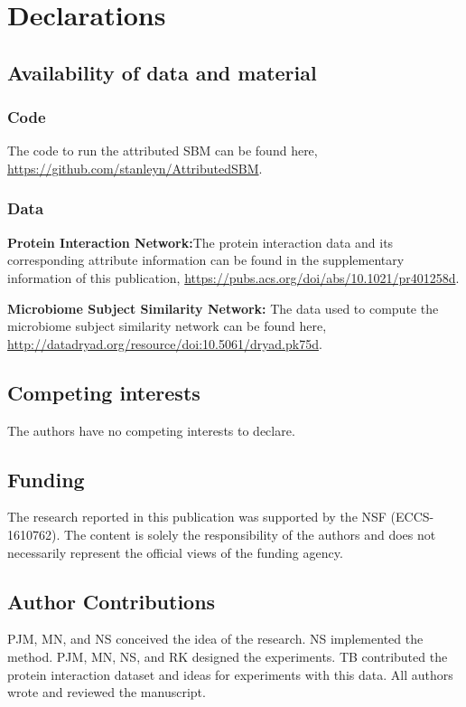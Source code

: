 \section{Declarations}

\subsection{Availability of data and material}

\subsubsection{Code}
The code to run the attributed SBM can be found here, \url{https://github.com/stanleyn/AttributedSBM}.

\subsubsection{Data}
{\bf Protein Interaction Network:}The protein interaction data and its corresponding attribute information can be found in the supplementary information of this publication, \url{https://pubs.acs.org/doi/abs/10.1021/pr401258d}. 

{\bf Microbiome Subject Similarity Network:} The data used to compute the microbiome subject similarity network can be found here, \url{http://datadryad.org/resource/doi:10.5061/dryad.pk75d}. 

\subsection{Competing interests}
The authors have no competing interests to declare. 

\subsection{Funding}
The research reported in this publication was supported by the NSF (ECCS-1610762). The content is solely the responsibility of the authors and does not necessarily represent the official views of the funding agency.

\subsection{Author Contributions}
PJM, MN, and NS conceived the idea of the research. NS implemented the method. PJM, MN, NS, and RK designed the experiments. TB contributed the protein interaction dataset and ideas for experiments with this data. All authors wrote and reviewed the manuscript. 

